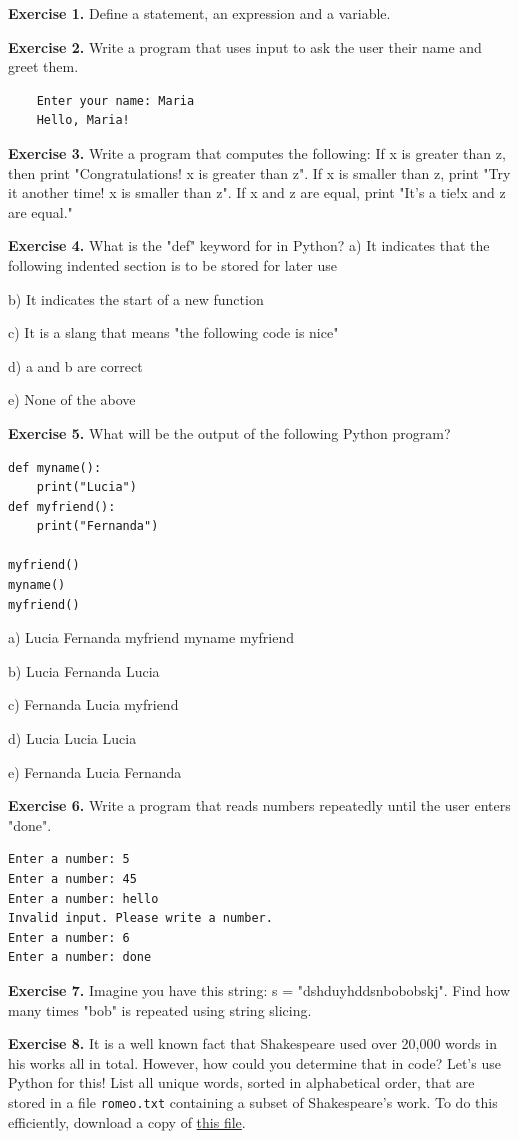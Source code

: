 \textbf{Exercise 1.} Define a statement, an expression and a variable.

\textbf{Exercise 2.} Write a program that uses input to ask the user their name and greet them.
\begin{verbatim}
    Enter your name: Maria
    Hello, Maria!
\end{verbatim}

\textbf{Exercise 3.} Write a program that computes the following: If x is greater than z, then print "Congratulations! x is greater than z". If x is smaller than z, print "Try it another time! x is smaller than z". If x and z are equal, print "It's a tie!x and z are equal."

\textbf{Exercise 4.} What is the "def" keyword for in Python?
a) It indicates that the following indented section is to be stored for later use

b) It indicates the start of a new function

c) It is a slang that means "the following code is nice"

d) a and b are correct

e) None of the above

\textbf{Exercise 5.} What will be the output of the following Python program?
\begin{verbatim}
def myname():
    print("Lucia")
def myfriend():
    print("Fernanda")

myfriend()
myname()
myfriend()
\end{verbatim}

a) Lucia Fernanda myfriend myname myfriend

b) Lucia Fernanda Lucia

c) Fernanda Lucia myfriend

d) Lucia Lucia Lucia

e) Fernanda Lucia Fernanda

\textbf{Exercise 6.} Write a program that reads numbers repeatedly until the user enters "done".
\begin{verbatim}
Enter a number: 5
Enter a number: 45
Enter a number: hello
Invalid input. Please write a number.
Enter a number: 6
Enter a number: done
\end{verbatim}

\textbf{Exercise 7.} Imagine you have this string: s = "dshduyhddsnbobobskj". Find how many times "bob" is repeated using string slicing.

\textbf{Exercise 8.} It is a well known fact that Shakespeare used over 20,000 words in his works all in total. However, how could you determine that in code? Let's use Python for this! List all unique words, sorted in alphabetical order, that are stored in a file \texttt{romeo.txt} containing a subset of Shakespeare's work. To do this efficiently, download a copy of \href{www.py4e.com/code3/romeo.txt}{this file}.

